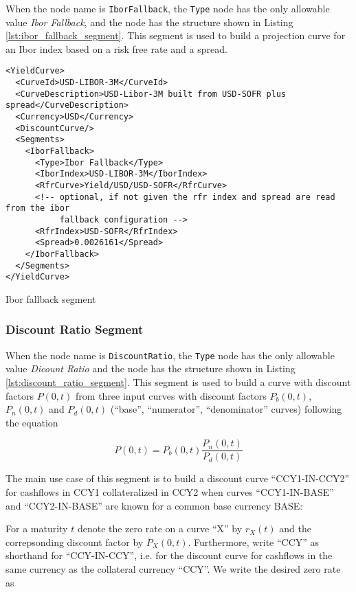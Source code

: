 When the node name is \lstinline!IborFallback!, the \lstinline!Type! node has the only allowable value \emph{Ibor
  Fallback}, and the node has the structure shown in Listing \ref{lst:ibor_fallback_segment}. This segment is used to
build a projection curve for an Ibor index based on a risk free rate and a spread.

\begin{listing}[H]
\begin{verbatim}
<YieldCurve>
  <CurveId>USD-LIBOR-3M</CurveId>
  <CurveDescription>USD-Libor-3M built from USD-SOFR plus spread</CurveDescription>
  <Currency>USD</Currency>
  <DiscountCurve/>
  <Segments>
    <IborFallback>
      <Type>Ibor Fallback</Type>
      <IborIndex>USD-LIBOR-3M</IborIndex>
      <RfrCurve>Yield/USD/USD-SOFR</RfrCurve>
      <!-- optional, if not given the rfr index and spread are read from the ibor
           fallback configuration -->
      <RfrIndex>USD-SOFR</RfrIndex>
      <Spread>0.0026161</Spread>
    </IborFallback>
  </Segments>
</YieldCurve>
\end{verbatim}
\caption{Ibor fallback segment}
\label{lst:ibor_fallback_segment}
\end{listing}

\subsubsection*{Discount Ratio Segment}
\label{sec:dicount_ratio_segment}

When the node name is \lstinline!DiscountRatio!, the \lstinline!Type! node has the only allowable value \emph{Dicount
Ratio} and the node has the structure shown in Listing \ref{lst:discount_ratio_segment}. This segment is used to build a
curve with discount factors $P(0,t)$ from three input curves with discount factors $P_b(0,t)$, $P_n(0,t)$ and $P_d(0,t)$
(``base'', ``numerator'', ``denominator'' curves) following the equation

\begin{equation}\label{discount_ratio_df}
  P(0,t) = P_b(0,t) \frac{P_n(0,t)}{P_d(0,t)}
\end{equation}

The main use case of this segment is to build a discount curve ``CCY1-IN-CCY2'' for cashflows in CCY1 collateralized in
CCY2 when curves ``CCY1-IN-BASE'' and ``CCY2-IN-BASE'' are known for a common base currency BASE:

For a maturity $t$ denote the zero rate on a curve ``X'' by $r_X(t)$ and the correpsonding discount factor by
$P_X(0,t)$. Furthermore, write ``CCY'' as shorthand for ``CCY-IN-CCY'', i.e. for the discount curve for cashflows in the
same currency as the collateral currency ``CCY''. We write the desired zero rate as

